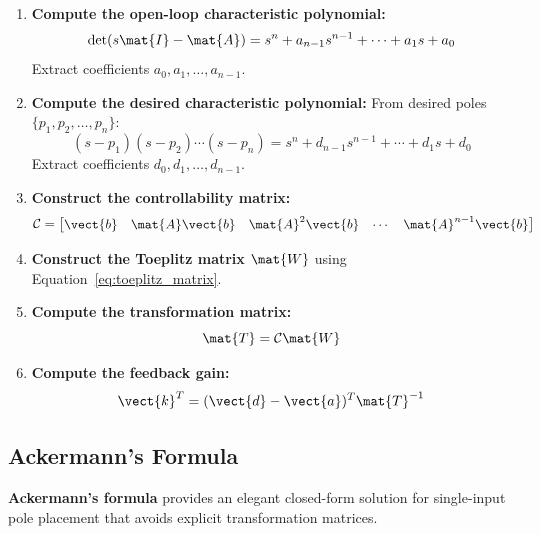 \begin{enumerate}
    \item \textbf{Compute the open-loop characteristic polynomial:}
    \begin{equation}
    \det(s\mat{I} - \mat{A}) = s^n + a_{n-1}s^{n-1} + \cdots + a_1s + a_0
    \end{equation}
    Extract coefficients $a_0, a_1, \ldots, a_{n-1}$.

    \item \textbf{Compute the desired characteristic polynomial:}
    From desired poles $\{p_1, p_2, \ldots, p_n\}$:
    \begin{equation}
    (s - p_1)(s - p_2)\cdots(s - p_n) = s^n + d_{n-1}s^{n-1} + \cdots + d_1s + d_0
    \end{equation}
    Extract coefficients $d_0, d_1, \ldots, d_{n-1}$.

    \item \textbf{Construct the controllability matrix:}
    \begin{equation}
    \mathcal{C} = \begin{bmatrix} \vect{b} & \mat{A}\vect{b} & \mat{A}^2\vect{b} & \cdots & \mat{A}^{n-1}\vect{b} \end{bmatrix}
    \end{equation}

    \item \textbf{Construct the Toeplitz matrix $\mat{W}$} using Equation~\eqref{eq:toeplitz_matrix}.

    \item \textbf{Compute the transformation matrix:}
    \begin{equation}
    \mat{T} = \mathcal{C}\mat{W}
    \end{equation}

    \item \textbf{Compute the feedback gain:}
    \begin{equation}
    \vect{k}^T = (\vect{d} - \vect{a})^T\mat{T}^{-1}
    \end{equation}
\end{enumerate}

\subsection{Ackermann's Formula}
\label{subsec:ackermann}

\textbf{Ackermann's formula} provides an elegant closed-form solution for single-input pole placement that avoids explicit transformation matrices.

